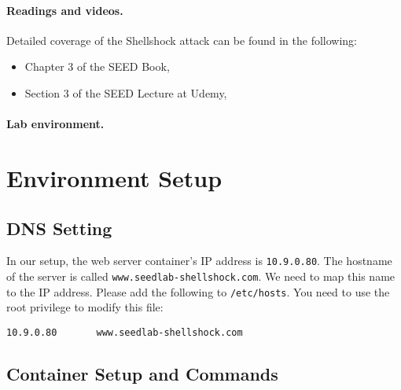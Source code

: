 \paragraph{Readings and videos.}
Detailed coverage of the Shellshock attack can be found in the following:

\begin{itemize}
\item Chapter 3 of the SEED Book, \seedbook
\item Section 3 of the SEED Lecture at Udemy, \seedcsvideo
\end{itemize}


\paragraph{Lab environment.} \seedenvironmentB \nodependency



\section{Environment Setup} 



\subsection{DNS Setting}

In our setup, the web server container's IP address is
\texttt{10.9.0.80}. The hostname of the server is called
\texttt{www.seedlab-shellshock.com}. We need to map
this name to the IP address. Please add the following
to \texttt{/etc/hosts}. You need to use the root privilege
to modify this file: 

\begin{lstlisting}
10.9.0.80       www.seedlab-shellshock.com
\end{lstlisting}
 


\subsection{Container Setup and Commands}




